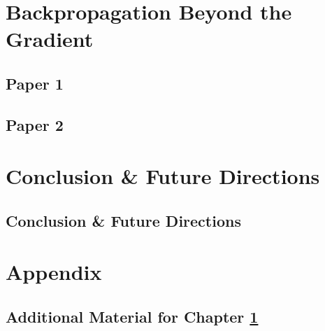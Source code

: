 
\part{Backpropagation Beyond the Gradient}\label{part:papers}

\setchapterpreamble[u]{\margintoc}
\chapter{Paper 1}\label{chap:paper-1}


\setchapterpreamble[u]{\margintoc}
\chapter{Paper 2}\label{chap:paper-2}




\part{Conclusion \& Future Directions}\label{part:conclusion}

\setchapterpreamble[u]{\margintoc}
\chapter{Conclusion \& Future Directions}\label{chap:conclusion}



\appendix %

\part{Appendix}\label{part:appendix}

\setchapterpreamble[u]{\margintoc}
\chapter{Additional Material for Chapter \ref{chap:paper-1}}


